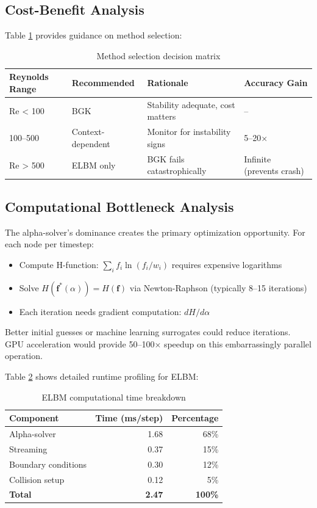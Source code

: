 \subsection{Cost-Benefit Analysis}

Table \ref{tab:decision_matrix} provides guidance on method selection:

\begin{table}[h]
\centering
\caption{Method selection decision matrix}
\label{tab:decision_matrix}
\begin{tabular}{llll}
\toprule
\textbf{Reynolds Range} & \textbf{Recommended} & \textbf{Rationale} & \textbf{Accuracy Gain} \\
\midrule
Re < 100 & BGK & Stability adequate, cost matters & -- \\
100–500 & Context-dependent & Monitor for instability signs & 5–20× \\
Re > 500 & ELBM only & BGK fails catastrophically & Infinite (prevents crash) \\
\bottomrule
\end{tabular}
\end{table}

\subsection{Computational Bottleneck Analysis}

The alpha-solver's dominance creates the primary optimization opportunity. For each node per timestep:
\begin{itemize}
    \item Compute H-function: $\sum_i f_i \ln(f_i/w_i)$ requires expensive logarithms
    \item Solve $H(\mathbf{f}^*(\alpha)) = H(\mathbf{f})$ via Newton-Raphson (typically 8–15 iterations)
    \item Each iteration needs gradient computation: $dH/d\alpha$
\end{itemize}

Better initial guesses or machine learning surrogates could reduce iterations. GPU acceleration would provide 50–100× speedup on this embarrassingly parallel operation.

Table \ref{tab:profiling_breakdown} shows detailed runtime profiling for ELBM:

\begin{table}[h]
\centering
\caption{ELBM computational time breakdown}
\label{tab:profiling_breakdown}
\begin{tabular}{lrr}
\toprule
\textbf{Component} & \textbf{Time (ms/step)} & \textbf{Percentage} \\
\midrule
Alpha-solver & 1.68 & 68\% \\
Streaming & 0.37 & 15\% \\
Boundary conditions & 0.30 & 12\% \\
Collision setup & 0.12 & 5\% \\
\bottomrule
\textbf{Total} & \textbf{2.47} & \textbf{100\%} \\
\bottomrule
\end{tabular}
\end{table}

